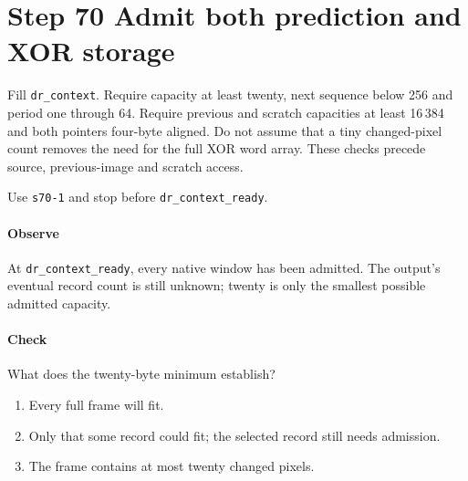 \section{Step 70 Admit both prediction and XOR storage}
Fill \texttt{dr\_context}. Require capacity at least twenty, next sequence below 256 and period one through 64. Require previous and scratch capacities at least 16\,384 and both pointers four-byte aligned. Do not assume that a tiny changed-pixel count removes the need for the full XOR word array. These checks precede source, previous-image and scratch access.

Use \texttt{s70-1} and stop before \texttt{dr\_context\_ready}.

\paragraph{Observe} At \texttt{dr\_context\_ready}, every native window has been admitted. The output's eventual record count is still unknown; twenty is only the smallest possible admitted capacity.

\paragraph{Check} What does the twenty-byte minimum establish?
\begin{enumerate}[label=\Alph*.]
\item Every full frame will fit.
\item Only that some record could fit; the selected record still needs admission.
\item The frame contains at most twenty changed pixels.
\end{enumerate}
